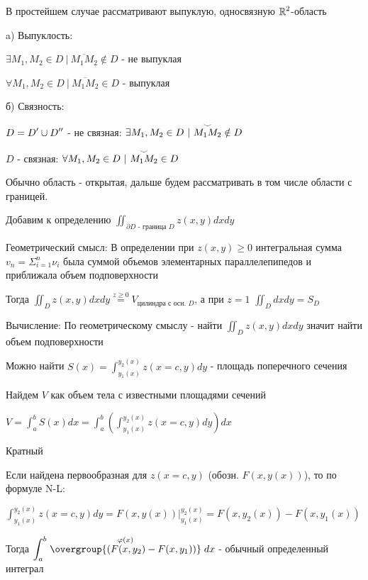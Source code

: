 \documentclass[12pt]{article}
\begin{document}
    В простейшем случае рассматривают выпуклую, односвязную $\displaystyle \mathbb{R}^2$-область

    a) Выпуклость:

    $\displaystyle \exists M_1, M_2 \in D \ | \ \overline{M_1 M_2} \notin D$ - не выпуклая

    $\displaystyle \forall M_1, M_2 \in D \ | \ \overline{M_1 M_2} \in D$ - выпуклая

    б) Связность:

    $\displaystyle D = D^\prime \cup D^{\prime\prime}$ - не связная: $\displaystyle \exists M_1, M_2 \in D \ | \ \overset{\LARGE\smile}{M_1 M_2} \notin D$

    $D$ - связная: $\displaystyle \forall M_1, M_2 \in D \ | \ \overset{\LARGE\smile}{M_1 M_2} \in D$

    Обычно область - открытая, дальше будем рассматривать в том числе области с границей.

    Добавим к определению $\displaystyle \iint_{\partial D \text{ - граница } D} z(x, y) dx dy$

    Геометрический смысл: В определении при $z(x, y) \geq 0$ интегральная сумма $\displaystyle v_n = \Sigma_{i=1}^n \nu_i$ была суммой объемов элементарных параллелепипедов и приближала объем подповерхности

    Тогда $\displaystyle \iint_D z(x, y) dx dy \stackrel{z \geq 0}{=} V_{\text{цилиндра с осн. } D}$, а при $z = 1$ $\displaystyle \iint_D dx dy = S_D$

    Вычисление: По геометрическому смыслу - найти $\displaystyle \iint_D z(x, y) dx dy$ значит найти объем подповерхности

    Можно найти $\displaystyle S(x) = \int^{y_2(x)}_{y_1(x)} z(x = c, y) dy$ - площадь поперечного сечения

    Найдем $V$ как объем тела с известными площадями сечений

    $\displaystyle V = \int^b_a S(x) dx = \int_a^b \left(\int^{y_2(x)}_{y_1(x)} z(x = c, y) dy\right) dx$

    \Nota Кратный

    Если найдена первообразная для $z(x = c, y)$ (обозн. $F(x, y(x))$), то по формуле N-L:

    $\displaystyle \int^{y_2(x)}_{y_1(x)} z(x = c, y) dy = F(x, y(x)) \Big|^{y_2(x)}_{y_1(x)} = F(x, y_2(x)) - F(x, y_1(x))$

    Тогда $\displaystyle \int^b_a \stackrel{\varphi(x)}{\overgroup{(F(x, y_2) - F(x, y_1))}} dx$ - обычный определенный интеграл
\end{document}
